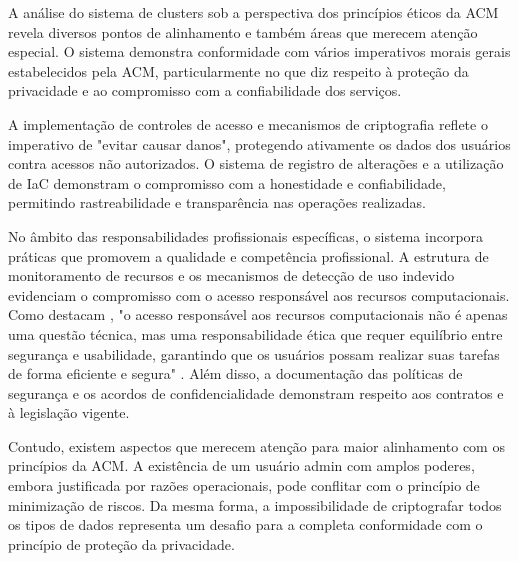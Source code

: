 A análise do sistema de clusters sob a perspectiva dos princípios éticos da ACM revela diversos pontos de alinhamento e também áreas que merecem atenção especial. O sistema demonstra conformidade com vários imperativos morais gerais estabelecidos pela ACM, particularmente no que diz respeito à proteção da privacidade e ao compromisso com a confiabilidade dos serviços.

A implementação de controles de acesso e mecanismos de criptografia reflete o imperativo de "evitar causar danos", protegendo ativamente os dados dos usuários contra acessos não autorizados. O sistema de registro de alterações e a utilização de IaC demonstram o compromisso com a honestidade e confiabilidade, permitindo rastreabilidade e transparência nas operações realizadas.

No âmbito das responsabilidades profissionais específicas, o sistema incorpora práticas que promovem a qualidade e competência profissional. A estrutura de monitoramento de recursos e os mecanismos de detecção de uso indevido evidenciam o compromisso com o acesso responsável aos recursos computacionais. Como destacam \citeauthor{adams1999users}, "o acesso responsável aos recursos computacionais não é apenas uma questão técnica, mas uma responsabilidade ética que requer equilíbrio entre segurança e usabilidade, garantindo que os usuários possam realizar suas tarefas de forma eficiente e segura" \cite{adams1999users}. Além disso, a documentação das políticas de segurança e os acordos de confidencialidade demonstram respeito aos contratos e à legislação vigente.

Contudo, existem aspectos que merecem atenção para maior alinhamento com os princípios da ACM. A existência de um usuário admin com amplos poderes, embora justificada por razões operacionais, pode conflitar com o princípio de minimização de riscos. Da mesma forma, a impossibilidade de criptografar todos os tipos de dados representa um desafio para a completa conformidade com o princípio de proteção da privacidade.